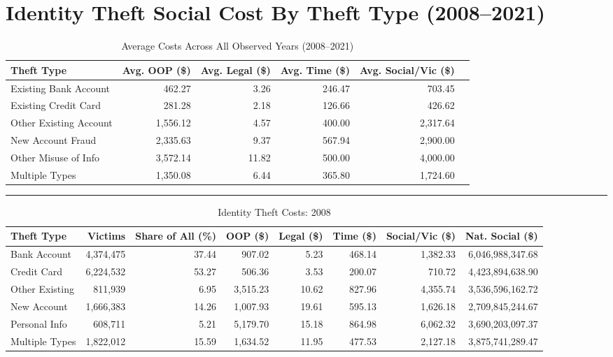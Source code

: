 \documentclass{article}
\begin{document}
\section*{Identity Theft Social Cost By Theft Type (2008--2021)}

\begin{table}[ht]
    \centering
    \caption{Average Costs Across All Observed Years (2008--2021)}
    \small
    \begin{tabularx}{\textwidth}{X r r r r r}
        \toprule
        \textbf{Theft Type} & \textbf{Avg. OOP (\$)} & \textbf{Avg. Legal (\$)} & \textbf{Avg. Time (\$)} & \textbf{Avg. Social/Vic (\$)} \\ \midrule
        Existing Bank Account  & 462.27  & 3.26  & 246.47 & 703.45  \\
        Existing Credit Card   & 281.28  & 2.18  & 126.66 & 426.62  \\
        Other Existing Account & 1,556.12 & 4.57  & 400.00 & 2,317.64 \\
        New Account Fraud      & 2,335.63 & 9.37  & 567.94 & 2,900.00 \\
        Other Misuse of Info   & 3,572.14 & 11.82 & 500.00 & 4,000.00 \\
        Multiple Types         & 1,350.08 & 6.44  & 365.80 & 1,724.60 \\
        \bottomrule
    \end{tabularx}
\end{table}

\vspace{1em}
\hrule
\vspace{1em}

\begin{table}[ht]
    \centering
    \caption{Identity Theft Costs: 2008}
    \scriptsize
    \begin{tabularx}{\textwidth}{X r r r r r r r}
        \toprule
        \textbf{Theft Type} & \textbf{Victims} & \textbf{Share of All (\%)} & \textbf{OOP (\$)} & \textbf{Legal (\$)} & \textbf{Time (\$)} & \textbf{Social/Vic (\$)} & \textbf{Nat. Social (\$)} \\ \midrule
        Bank Account & 4,374,475 & 37.44 & 907.02 & 5.23 & 468.14 & 1,382.33 & 6,046,988,347.68 \\
        Credit Card & 6,224,532 & 53.27 & 506.36 & 3.53 & 200.07 & 710.72 & 4,423,894,638.90 \\
        Other Existing & 811,939 & 6.95 & 3,515.23 & 10.62 & 827.96 & 4,355.74 & 3,536,596,162.72 \\
        New Account & 1,666,383 & 14.26 & 1,007.93 & 19.61 & 595.13 & 1,626.18 & 2,709,845,244.67 \\
        Personal Info & 608,711 & 5.21 & 5,179.70 & 15.18 & 864.98 & 6,062.32 & 3,690,203,097.37 \\
        Multiple Types & 1,822,012 & 15.59 & 1,634.52 & 11.95 & 477.53 & 2,127.18 & 3,875,741,289.47 \\
        \bottomrule
    \end{tabularx}
\end{table}
\end{document}
